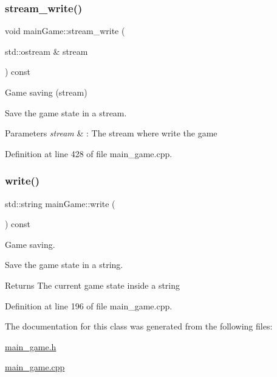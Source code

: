\subsubsection{\texorpdfstring{stream\+\_\+write()}{stream\_write()}}
{\footnotesize\ttfamily void main\+Game\+::stream\+\_\+write (\begin{DoxyParamCaption}\item[{std\+::ostream \&}]{stream }\end{DoxyParamCaption}) const}



Game saving (stream) 

Save the game state in a stream.


\begin{DoxyParams}{Parameters}
{\em stream} & \+: The stream where write the game \\
\hline
\end{DoxyParams}


Definition at line 428 of file main\+\_\+game.\+cpp.

\hypertarget{classmain_game_a4008fd9fe3a236d044d580725cdf0920}{}\label{classmain_game_a4008fd9fe3a236d044d580725cdf0920} 
\subsubsection{\texorpdfstring{write()}{write()}}
{\footnotesize\ttfamily std\+::string main\+Game\+::write (\begin{DoxyParamCaption}{ }\end{DoxyParamCaption}) const}



Game saving. 

Save the game state in a string.

\begin{DoxyReturn}{Returns}
The current game state inside a string 
\end{DoxyReturn}


Definition at line 196 of file main\+\_\+game.\+cpp.



The documentation for this class was generated from the following files\+:\begin{DoxyCompactItemize}
\item 
\hyperlink{main__game_8h}{main\+\_\+game.\+h}\item 
\hyperlink{main__game_8cpp}{main\+\_\+game.\+cpp}\end{DoxyCompactItemize}
